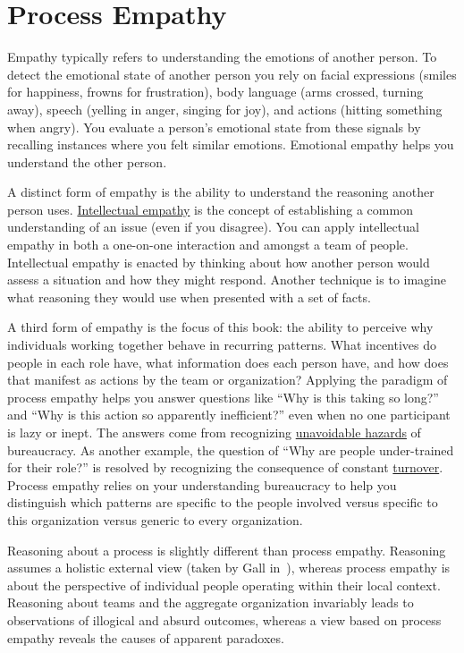 \section{Process Empathy\label{sec:process-empathy}}

Empathy typically refers to understanding the emotions of another person. To detect the emotional state of another person you rely on facial expressions (smiles for happiness, frowns for frustration), body language (arms crossed, turning away), speech (yelling in anger, singing for joy), and actions (hitting something when angry). You evaluate a person's emotional state from these signals by recalling instances where you felt similar emotions. Emotional empathy helps you understand the other person. 

A distinct form of empathy is the ability to understand the reasoning another person uses.  
\hyperref[sec:intellectual-empathy]{Intellectual empathy} 
is the concept of establishing a common understanding of an issue (even if you disagree). You can apply intellectual empathy in both a one-on-one interaction and amongst a team of people. Intellectual empathy is enacted by thinking about how another person would assess a situation and how they might respond. Another technique is to imagine what reasoning they would use when presented with a set of facts. 


A third form of empathy is the focus of this book: the ability to perceive why individuals working together behave in recurring patterns. What incentives do people in each role have, what information does each person have, and how does that manifest as actions by the team or organization? Applying the paradigm of \gls{process empathy} helps you answer questions like ``Why is this taking so long?'' and ``Why is this action so apparently inefficient?'' even when no one participant is lazy or inept. The answers come from recognizing \hyperref[sec:unavoidable-hazards]{unavoidable hazards} 
of bureaucracy. As another example, the question of ``Why are people under-trained for their role?'' is resolved by recognizing the consequence of  constant \hyperref[sec:turnover]{turnover}. 
Process empathy relies on your understanding bureaucracy to help you distinguish which patterns are specific to the people involved versus specific to this organization versus generic to every organization.

Reasoning about a process is slightly different than process empathy. Reasoning assumes a holistic external view (taken by Gall in~\cite{2002_Gall}), whereas process empathy is about the perspective of individual people operating within their local context. Reasoning about teams and the aggregate organization invariably leads to observations of illogical and absurd outcomes, whereas a view based on process empathy reveals the causes of apparent paradoxes.

